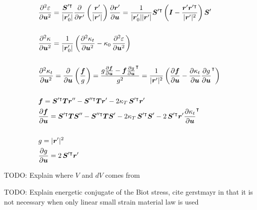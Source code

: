 \begin{align}
&\frac{\partial^2\varepsilon}{\partial\boldsymbol{u}^2} = \frac{\boldsymbol{S}'^\intercal}{|\boldsymbol{r}_{0}'|}\frac{\partial}{\partial\boldsymbol{r}'}\left(\frac{\boldsymbol{r}'}{|\boldsymbol{r}'|}\right)\frac{\partial\boldsymbol{r}'}{\partial\boldsymbol{u}} = \frac{1}{|\boldsymbol{r}_{0}'||\boldsymbol{r}'|}\boldsymbol{S}'^\intercal\left(\boldsymbol{I} - \frac{\boldsymbol{r}'\boldsymbol{r}'^\intercal}{|\boldsymbol{r}'|^2}\right)\boldsymbol{S}' \\
\notag \\
&\frac{\partial^2\kappa}{\partial\boldsymbol{u}^2} = \frac{1}{|\boldsymbol{r}_{0}'|}\left(\frac{\partial^2\kappa_{t}}{\partial\boldsymbol{u}^2} - \kappa_0\,\frac{\partial^2\varepsilon}{\partial\boldsymbol{u}^2}\right) \\
\notag \\
&\frac{\partial^2 \kappa_{t}}{\partial \boldsymbol{u}^2} = \frac{\partial}{\partial \boldsymbol{u}}\left(\frac{\boldsymbol{f}}{g}\right) = \frac{g\frac{\partial \boldsymbol{f}}{\partial \boldsymbol{u}} - \boldsymbol{f}\frac{\partial g}{\partial \boldsymbol{u}}^\intercal}{g^2} = \frac{1}{|\boldsymbol{r}'|^2}\left(\frac{\partial\boldsymbol{f}}{\partial\boldsymbol{u}} - \frac{\partial\kappa_{t}}{\partial\boldsymbol{u}}\frac{\partial g}{\partial\boldsymbol{u}}^\intercal\right) \\
\notag \\
&\boldsymbol{f} = \boldsymbol{S}'^\intercal\boldsymbol{T}\boldsymbol{r}'' - \boldsymbol{S}''^\intercal\boldsymbol{T}\boldsymbol{r}' - 2\kappa_{T}\,\boldsymbol{S}'^\intercal\boldsymbol{r}' \\
&\frac{\partial \boldsymbol{f}}{\partial \boldsymbol{u}} = \boldsymbol{S}'^\intercal\boldsymbol{T}\boldsymbol{S}'' - \boldsymbol{S}''^\intercal\boldsymbol{T}\boldsymbol{S}' - 2\kappa_{T}\,\boldsymbol{S}'^\intercal\boldsymbol{S}' - 2\,\boldsymbol{S}'^\intercal\boldsymbol{r}'\frac{\partial \kappa_t}{\partial \boldsymbol{u}}^\intercal \\
\notag \\
&g = |\boldsymbol{r}'|^2 \\
&\frac{\partial g}{\partial \boldsymbol{u}} = 2\,\boldsymbol{S}'^\intercal\boldsymbol{r}'
\end{align}

\newpage

TODO: Explain where $V$ and $dV$ comes from

TODO: Explain energetic conjugate of the Biot stress, cite gerstmayr in that it is not necessary when only linear small strain material law is used

